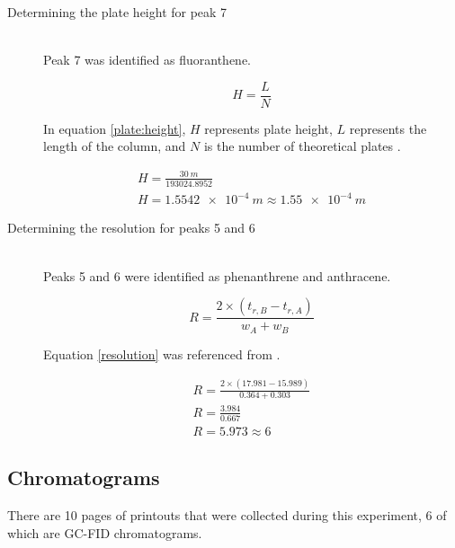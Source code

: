 \documentclass[a4paper, 12pt]{article}
\begin{document}
\begin{description}
\item[Determining the plate height for peak 7] \hfill \\
	Peak 7 was identified as fluoranthene.

	\begin{equation} \label{plate:height}
		H = \frac{L}{N}
	\end{equation}

	In equation \ref{plate:height}, $H$ represents plate height, $L$ represents the length of the column, and $N$ is the number of theoretical plates \cite{harris_quantitative_2010}.

	\begin{gather*}
		H = \frac{\SI{30}{m}}{193024.8952} \\
		H = \SI{1.5542e-4}{m} \approx \SI{1.55e-4}{m}
	\end{gather*}

\item[Determining the resolution for peaks 5 and 6] \hfill \\
	Peaks 5 and 6 were identified as phenanthrene and anthracene.

	\begin{equation} \label{resolution}
		R = \frac{2 \times (t_{r,B} - t_{r,A})}{w_A + w_B}
	\end{equation}

	Equation \ref{resolution} was referenced from \cite{vitha_chromatography:_2017}.

	\begin{gather*}
		R = \frac{2 \times (17.981 - 15.989)}{0.364 + 0.303} \\
		R = \frac{3.984}{0.667} \\
		R = 5.973 \approx 6
	\end{gather*}

\end{description}

\subsection{Chromatograms}
There are 10 pages of printouts that were collected during this experiment, 6 of which are GC-FID chromatograms.


\end{document}

